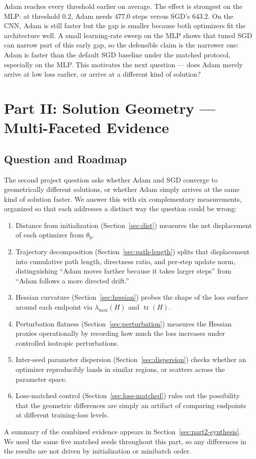 \documentclass[11pt]{article}
\begin{document}
Adam reaches every threshold earlier on average. The effect is strongest on the MLP: at threshold $0.2$, Adam needs $477.0$ steps versus SGD's $643.2$. On the CNN, Adam is still faster but the gap is smaller because both optimizers fit the architecture well. A small learning-rate sweep on the MLP shows that tuned SGD can narrow part of this early gap, so the defensible claim is the narrower one: Adam is faster than the default SGD baseline under the matched protocol, especially on the MLP. This motivates the next question --- does Adam merely arrive at low loss earlier, or arrive at a different kind of solution?

\FloatBarrier

\section{Part II: Solution Geometry --- Multi-Faceted Evidence}
\label{sec:part2}

\subsection{Question and Roadmap}

The second project question asks whether Adam and SGD converge to geometrically different solutions, or whether Adam simply arrives at the same kind of solution faster. We answer this with six complementary measurements, organized so that each addresses a distinct way the question could be wrong:
\begin{enumerate}
\item Distance from initialization (Section~\ref{sec:dist}) measures the net displacement of each optimizer from $\theta_0$.
\item Trajectory decomposition (Section~\ref{sec:path-length}) splits that displacement into cumulative path length, directness ratio, and per-step update norm, distinguishing ``Adam moves farther because it takes larger steps'' from ``Adam follows a more directed drift.''
\item Hessian curvature (Section~\ref{sec:hessian}) probes the shape of the loss surface around each endpoint via $\lambda_{\max}(H)$ and $\operatorname{tr}(H)$.
\item Perturbation flatness (Section~\ref{sec:perturbation}) measures the Hessian proxies operationally by recording how much the loss increases under controlled isotropic perturbations.
\item Inter-seed parameter dispersion (Section~\ref{sec:dispersion}) checks whether an optimizer reproducibly lands in similar regions, or scatters across the parameter space.
\item Loss-matched control (Section~\ref{sec:loss-matched}) rules out the possibility that the geometric differences are simply an artifact of comparing endpoints at different training-loss levels.
\end{enumerate}
A summary of the combined evidence appears in Section~\ref{sec:part2-synthesis}. We used the same five matched seeds throughout this part, so any differences in the results are not driven by initialization or minibatch order.
\end{document}
